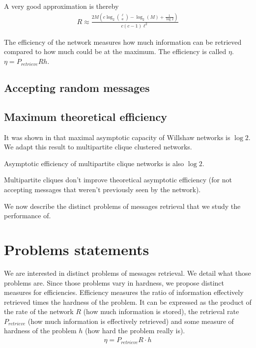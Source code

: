 \documentclass[english,10pt,twocolumn]{IEEEtran}
\theoremstyle{definition}
\begin{document}
		A very good approximation is thereby \begin{align}
		R \approx \frac{2M \left(c \log_2{\ell \choose a } - \log_2(M) + \frac{1}{\log 2} \right)}{c(c-1)\ell^2}
		\label{rateth}
		\end{align}
		
		
		
		The efficiency of the network measures how much information can be retrieved compared to how much could be at the maximum. The efficiency is called $\eta$. $\eta = P_{retrieve} R  h$. 
		
	\subsection{Accepting random messages}	
	
	\subsection{Maximum theoretical efficiency}
		It was shown in \cite{Palm1980} that maximal asymptotic capacity of Willshaw networks is $\log 2$. We adapt this result to multipartite clique clustered networks.
		
		Asymptotic efficiency of multipartite clique networks is also $\log 2$.
		
		Multipartite cliques don't improve theoretical asymptotic efficiency (for not accepting messages that weren't previously seen by the network).


	We now describe the distinct problems of messages retrieval that we study the performance of.	
	
	\section{Problems statements}		
	
	We are interested in distinct problems of messages retrieval. We detail what those problems are. Since those problems vary in hardness, we propose distinct measures for efficiencies. Efficiency measures the ratio of information effectively retrieved times the hardness of the problem. It can be expressed as the product of the rate of the network $R$ (how much information is stored), the retrieval rate $P_{retrieve}$ (how much information is effectively retrieved) and some measure of hardness of the problem $h$ (how hard the problem really is).
	\begin{align}
		\eta = P_{retrieve} R \cdot h
		\label{defeff}
	\end{align}
	
\end{document}
